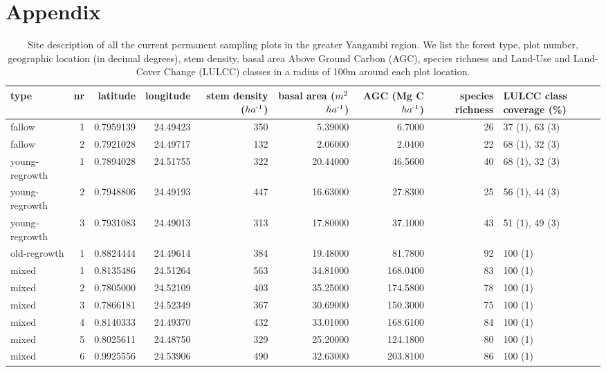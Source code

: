 \documentclass[landscape]{article}
\title{}
\author{}
\date{}
\begin{document}
\hypertarget{appendix}{%
\section{Appendix}\label{appendix}}

\begin{table}[!h]

\caption{\label{tab:unnamed-chunk-1}Site description of all the current permanent sampling plots in the greater Yangambi region. We list the forest type, plot number, geographic location (in decimal degrees), stem density, basal area Above Ground Carbon (AGC), species richness and Land-Use and Land-Cover Change (LULCC) classes in a radius of 100m around each plot location.}
\centering
\begin{tabular}[t]{lrrrrrrrl}
\toprule
type & nr & latitude & longitude & stem density ($ha\textsuperscript{-1}$) & basal area ($m\textsuperscript{2}$ $ha\textsuperscript{-1}$) & AGC (Mg C $ha\textsuperscript{-1}$) & species richness & LULCC class coverage (\%)\\
\midrule
fallow & 1 & 0.7959139 & 24.49423 & 350 & 5.39000 & 6.7000 & 26 & 37 (1), 63 (3)\\
fallow & 2 & 0.7921028 & 24.49717 & 132 & 2.06000 & 2.0400 & 22 & 68 (1), 32 (3)\\
young-regrowth & 1 & 0.7894028 & 24.51755 & 322 & 20.44000 & 46.5600 & 40 & 68 (1), 32 (3)\\
young-regrowth & 2 & 0.7948806 & 24.49193 & 447 & 16.63000 & 27.8300 & 25 & 56 (1), 44 (3)\\
young-regrowth & 3 & 0.7931083 & 24.49013 & 313 & 17.80000 & 37.1000 & 43 & 51 (1), 49 (3)\\
\addlinespace
old-regrowth & 1 & 0.8824444 & 24.49614 & 384 & 19.48000 & 81.7800 & 92 & 100 (1)\\
mixed & 1 & 0.8135486 & 24.51264 & 563 & 34.81000 & 168.0400 & 83 & 100 (1)\\
mixed & 2 & 0.7805000 & 24.52109 & 403 & 35.25000 & 174.5800 & 78 & 100 (1)\\
mixed & 3 & 0.7866181 & 24.52349 & 367 & 30.69000 & 150.3000 & 75 & 100 (1)\\
mixed & 4 & 0.8140333 & 24.49370 & 432 & 33.01000 & 168.6100 & 84 & 100 (1)\\
\addlinespace
mixed & 5 & 0.8025611 & 24.48750 & 329 & 25.20000 & 124.1800 & 80 & 100 (1)\\
mixed & 6 & 0.9925556 & 24.53906 & 490 & 32.63000 & 203.8100 & 86 & 100 (1)\\

\end{tabular}
\end{table}
\end{document}
